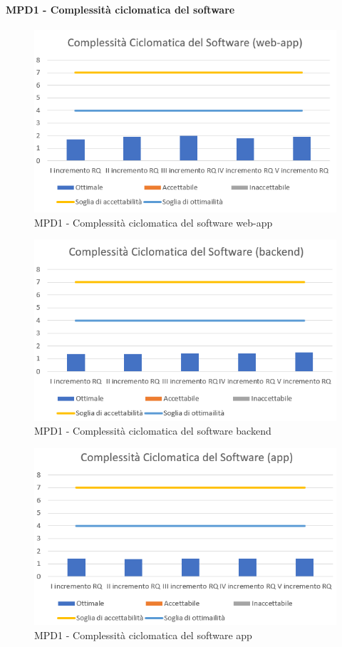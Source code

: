   \paragraph{MPD1 - Complessità ciclomatica del software}
  \begin{figure}[h!]
    \centering
      \includegraphics[scale=1]{Immagini/CicloCompl WA.PNG}
    \caption{MPD1 - Complessità ciclomatica del software web-app}
  \end{figure}

  \begin{figure}[h!]
    \centering
      \includegraphics[scale=1]{Immagini/CicloCompl BE.PNG}
    \caption{MPD1 - Complessità ciclomatica del software backend}
  \end{figure}

  \begin{figure}[h!]
    \centering
      \includegraphics[scale=1]{Immagini/CicloCompl APP.PNG}
    \caption{MPD1 - Complessità ciclomatica del software app}
  \end{figure}

